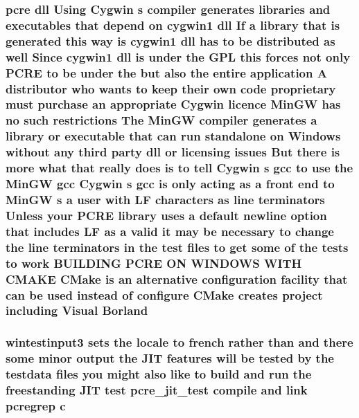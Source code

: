 \subsubsection[{\texorpdfstring{Borland}{Borland}}]{ {\bf pcre} dll Using Cygwin {\bf s} {\bf compiler} generates {\bf libraries} and executables that depend {\bf on} cygwin1 dll If {\bf a} {\bf library} that {\bf is} {\bf generated} {\bf this} {\bf way} {\bf is} cygwin1 dll has {\bf to} {\bf be} {\bf distributed} {\bf as} well Since cygwin1 dll {\bf is} under the {\bf G\+PL} {\bf this} forces {\bf not} only {\bf P\+C\+RE} {\bf to} {\bf be} under the but also the entire application {\bf A} distributor who wants {\bf to} keep their own {\bf code} proprietary must purchase an appropriate Cygwin {\bf licence} {\bf Min\+GW} has no such restrictions The {\bf Min\+GW} {\bf compiler} generates {\bf a} {\bf library} {\bf or} executable that {\bf can} {\bf run} standalone {\bf on} {\bf Windows} without {\bf any} third party dll {\bf or} licensing issues But there {\bf is} more {\bf what} that really does {\bf is} {\bf to} tell Cygwin {\bf s} {\bf gcc} {\bf to} use the {\bf Min\+GW} {\bf gcc} Cygwin {\bf s} {\bf gcc} {\bf is} only acting {\bf as} {\bf a} front {\bf end} {\bf to} {\bf Min\+GW} {\bf s} {\bf a} user {\bf with} {\bf LF} {\bf characters} {\bf as} {\bf line} terminators Unless your {\bf P\+C\+RE} {\bf library} uses {\bf a} {\bf default} {\bf newline} {\bf option} that includes {\bf LF} {\bf as} {\bf a} valid {\bf it} may {\bf be} necessary {\bf to} change the {\bf line} terminators {\bf in} the test {\bf files} {\bf to} get some {\bf of} the {\bf tests} {\bf to} work B\+U\+I\+L\+D\+I\+NG {\bf P\+C\+RE} ON W\+I\+N\+D\+O\+WS W\+I\+TH C\+M\+A\+KE C\+Make {\bf is} an alternative configuration {\bf facility} that {\bf can} {\bf be} {\bf used} instead {\bf of} {\bf configure} C\+Make creates {\bf project} including Visual Borland}\hypertarget{NON-AUTOTOOLS-BUILD_8txt_aa37ffa497b659c9e64b7f60ac4af0284}{}\label{NON-AUTOTOOLS-BUILD_8txt_aa37ffa497b659c9e64b7f60ac4af0284}
\subsubsection[{\texorpdfstring{c}{c}}]{\setlength{\rightskip}{0pt plus 5cm}wintestinput3 sets the {\bf locale} {\bf to} french rather {\bf than} and there some minor {\bf output} the J\+IT {\bf features} will {\bf be} tested by the testdata {\bf files} you might also like {\bf to} build and {\bf run} the freestanding J\+IT test pcre\+\_\+jit\+\_\+test {\bf compile} and link pcregrep c}\hypertarget{NON-AUTOTOOLS-BUILD_8txt_a5586554eab8ca6cac6f835d5f5784008}{}\label{NON-AUTOTOOLS-BUILD_8txt_a5586554eab8ca6cac6f835d5f5784008}
